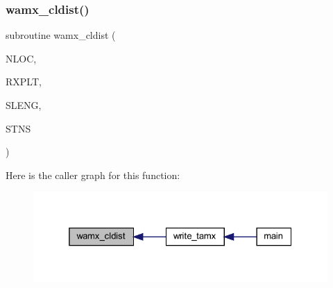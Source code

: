 \mbox{\label{Marco_8f90_a8e8bfb89895d93efddca033fd66889bd}} 
\subsubsection{\texorpdfstring{wamx\+\_\+cldist()}{wamx\_cldist()}}
{\footnotesize\ttfamily subroutine wamx\+\_\+cldist (\begin{DoxyParamCaption}\item[{integer, intent(in)}]{N\+L\+OC,  }\item[{real (kind = dp), dimension(max\+\_\+comp, nloc), intent(in)}]{R\+X\+P\+LT,  }\item[{real (kind = dp), dimension(nloc), intent(inout)}]{S\+L\+E\+NG,  }\item[{integer, intent(out)}]{S\+T\+NS }\end{DoxyParamCaption})}

Here is the caller graph for this function\+:
\nopagebreak
\begin{figure}[H]
\begin{center}
\leavevmode
\includegraphics[width=325pt]{Marco_8f90_a8e8bfb89895d93efddca033fd66889bd_icgraph}
\end{center}
\end{figure}
\mbox{\label{Marco_8f90_a1004d10c3bda42643945bbc256f4824f}} 
